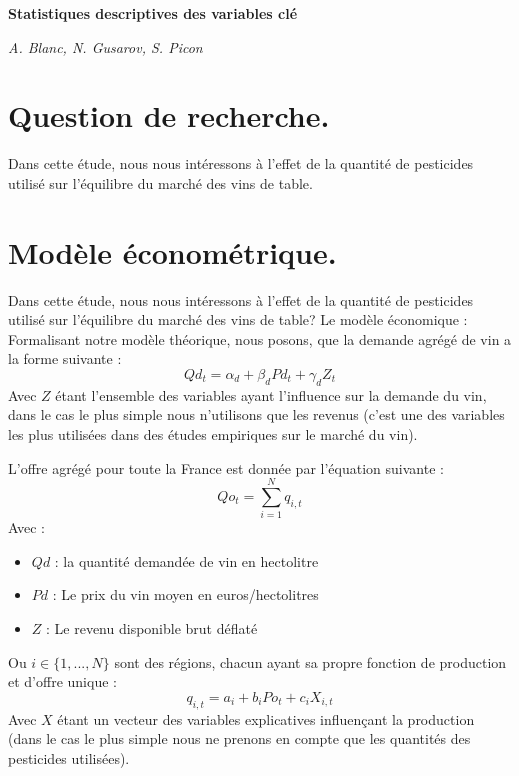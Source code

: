 \documentclass[11pt, a4paper]{article}
\begin{document}
\begin{center}
    \Large\textbf{Statistiques descriptives des variables clé}
    \par
    \large\textit{A. Blanc, N. Gusarov, S. Picon}
\end{center}

\section*{Question de recherche.}
Dans cette étude, nous nous intéressons à l’effet de la quantité de pesticides utilisé sur l’équilibre du marché des vins de table.

\section*{Modèle économétrique.}
Dans cette étude, nous nous intéressons à l’effet de la quantité de pesticides utilisé sur l’équilibre du marché des vins de table?
Le modèle économique :
Formalisant notre modèle théorique, nous posons, que la demande agrégé de vin a la forme suivante :
\begin{equation}
    Qd_t = \alpha_d + \beta_d Pd_t + \gamma_d Z_t
\end{equation}
Avec $Z$ étant l'ensemble des variables ayant l'influence sur la demande du vin, dans le cas le plus simple nous n'utilisons que les revenus (c'est une des variables les plus utilisées dans des études empiriques sur le marché du vin).
\par
L'offre agrégé pour toute la France est donnée par l'équation suivante : 
\begin{equation}
    Qo_t = \sum_{i = 1}^{N} q_{i,t}
\end{equation}
Avec :
\begin{itemize}
  \item $Qd$ : la quantité demandée de vin en hectolitre
  \item $Pd$ : Le prix du vin moyen en euros/hectolitres
  \item $Z$ : Le revenu disponible brut déflaté
\end{itemize}
Ou $i \in \{1, ..., N\}$ sont des régions, chacun ayant sa propre fonction de production et d'offre unique : 
\begin{equation}
    q_{i,t} = a_i + b_i Po_t + c_i X_{i,t}
\end{equation}
Avec $X$ étant un vecteur des variables explicatives influençant la production (dans le cas le plus simple nous ne prenons en compte que les quantités des pesticides utilisées).
\end{document}
